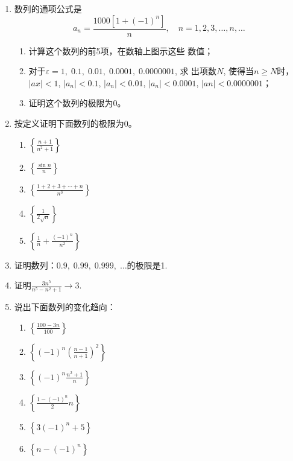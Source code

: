\begin{enumerate}
    \item 数列的通项公式是
\[a_n=\frac{1000[1+(-1)^n]}{n},\quad n=1,2,3,\ldots,n,\ldots\]
\begin{enumerate}
    \item 计算这个数列的前5项，在数轴上图示这些
    数值；
    \item 对于$\varepsilon=1,\; 0.1,\; 0.01,\; 0.0001,\; 0.0000001$, 求
    出项数$N$, 使得当$n\ge N$时，$|ax|<1$, $|a_n|<0.1$, $|a_n|<0.01$, $|a_n|<0.0001$, $|an|<0.0000001$；
    \item 证明这个数列的极限为0。
\end{enumerate}

    \item 按定义证明下面数列的极限为0。
\begin{multicols}{2}
\begin{enumerate}
    \item $\left\{\frac{n+1}{n^2+1}\right\}$
    \item $\left\{\frac{\sin n}{n}\right\}$
    \item $\left\{\frac{1+2+3+\cdots+n}{n^3}\right\}$
    \item $\left\{\frac{1}{2\sqrt{n}}\right\}$
    \item $\left\{\frac{1}{n}+\frac{(-1)^n}{n^2}\right\}$
\end{enumerate}
\end{multicols}
    \item 证明数列：$0.9,\;0.99,\;0.999,\;\ldots$的极限是1.

    \item 证明$\frac{3n^5}{n^5-n^2+1}\to 3$.
    \item 说出下面数列的变化趋向：
\begin{multicols}{2}
\begin{enumerate}
    \item $\left\{\frac{100-3n}{100}\right\}$
    \item $\left\{(-1)^n\left(\frac{n-1}{n+1}\right)^2\right\}$
    \item $\left\{(-1)^n\frac{n^2+1}{n}\right\}$
    \item $\left\{\frac{1-(-1)^n}{2}n\right\}$
    \item $\left\{3(-1)^n+5\right\}$
    \item $\left\{n-(-1)^n\right\}$
\end{enumerate}
\end{multicols}
\end{enumerate}

